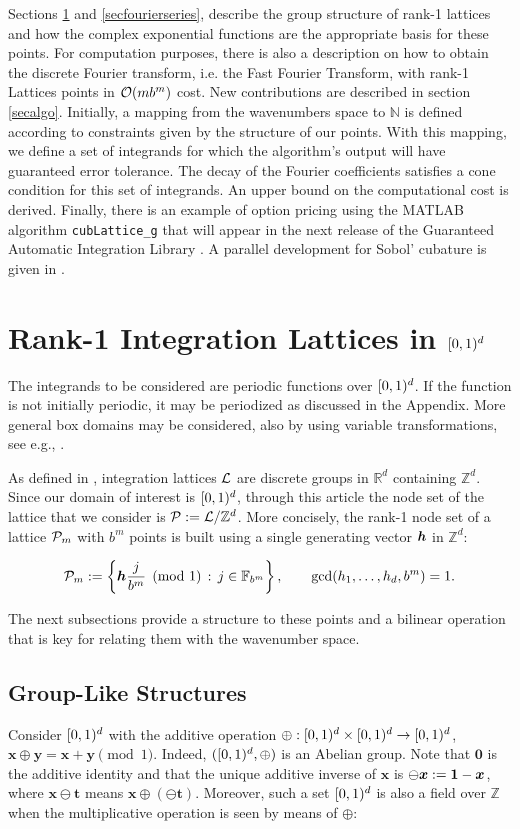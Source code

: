 \documentclass[graybox]{svmult}
\newcommand{\Z}{\mathbb{Z}} %
\newcommand{\R}{\mathbb{R}} %
\newcommand{\N}{\mathbb{N}} %
\newcommand{\F}{\mathbb{F}} %
\newcommand{\bszero}{\boldsymbol{0}} %
\newcommand{\bst}{\boldsymbol{t}}    %
\newcommand{\bsx}{\boldsymbol{x}}    %
\newcommand{\bsy}{\boldsymbol{y}}    %
\begin{document}
Sections \ref{secrank1lat} and \ref{secfourierseries}, describe the group structure of rank-1 lattices and how the complex exponential functions are the appropriate basis for these points. For computation purposes, there is also a description on how to obtain the discrete Fourier transform, i.e. the Fast Fourier Transform, with rank-1 Lattices points in $\mathcal{O}(mb^m)$ cost. New contributions are described in section \ref{secalgo}. Initially, a mapping from the wavenumbers space to $\N$ is defined according to constraints given by the structure of our points. With this mapping, we define a set of integrands for which the algorithm's output will have guaranteed error tolerance. The decay of the Fourier coefficients satisfies a cone condition for this set of integrands. An upper bound on the computational cost is derived. Finally, there is an example of option pricing using the MATLAB algorithm \texttt{cubLattice\_g} that will appear in the next release of the Guaranteed Automatic Integration Library \cite{ChoEtal14a}.  A parallel development for Sobol' cubature is given in \cite{HicJim16a}.

\section{Rank-1 Integration Lattices in $[0,1)^d$}\label{secrank1lat}
The integrands to be considered are periodic functions over $[0,1)^d$. If the function is not initially periodic, it may be periodized as discussed in the Appendix. More general box domains may be considered, also by using variable transformations, see e.g.,  \cite{HicSloWas03a,HicSloWas03e}.

As defined in \cite[Sec. 2.7-2.8]{SloJoe94}, integration lattices $\mathcal{L}$ are discrete groups in $\R^d$ containing $\Z^d$. Since our domain of interest is $[0,1)^d$, through this article the node set of the lattice that we consider is $\cp:=\lattice/\Z^d$. More concisely, the rank-1 node set of a lattice $\mathcal{P}_m$ with $b^m$ points is built using a single generating vector $\boldsymbol{h}$ in $\Z^d$:

\begin{equation}\label{latdef}
\cp_m :=\left\{\bsh\frac{j}{b^m}\pmod 1\, :\, j\in\F_{b^m}\right\},\qquad \gcd(h_1,\dots,h_d,b^m)=1.
\end{equation}

The next subsections provide a structure to these points and a bilinear operation that is key for relating them with the wavenumber space.

\subsection{Group-Like Structures}
Consider $[0,1)^d$ with the additive operation $\oplus:[0,1)^d \times [0,1)^d \to [0,1)^d$, $\bsx\oplus\bsy=\bsx+\bsy\pmod 1$. Indeed, $([0,1)^d,\oplus)$ is an Abelian group. Note that $\bszero$ is the additive identity and that the unique additive inverse of $\bsx$ is $\ominus \bsx:=\bold{1}-\bsx$, where $\bsx \ominus \bst$ means $\bsx \oplus (\ominus \bst)$. Moreover, such a set $[0,1)^d$ is also a field over $\Z$ when the multiplicative operation is seen by means of $\oplus$:
\end{document}
